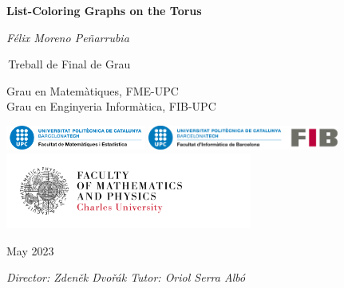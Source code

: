 \documentclass{article}
\theoremstyle{definition}
\begin{document}
\begin{titlepage}
    \begin{center}
        \vspace*{1cm}
            
        \Huge
        \textbf{List-Coloring Graphs on the Torus}
            
        \vspace{0.5cm}
        \Large
        \textit{Félix Moreno Peñarrubia}
            
        
            
        \,Treball de Final de Grau
            
        \vspace{0.8cm}
            
       
            
        \Large
        Grau en Matemàtiques, FME-UPC \\
        Grau en Enginyeria Informàtica, FIB-UPC \\
        \vspace{1.2cm}
        
        \includegraphics[height=0.8cm]{figures/logo_FME_cropped.png}
        \includegraphics[height=0.8cm]{figures/logo_FIB.jpg}
        \\
        \includegraphics[height=2.5cm]{figures/logo_MFF.png}
        \vfill
        
      
        May 2023
        
		\vspace{2cm}
		\large        
        \textit{Director: Zdeněk Dvořák \hspace{3cm} Tutor: Oriol Serra Albó}
        
        
            
    \end{center}
\end{titlepage}

\listoftodos
\end{document}

